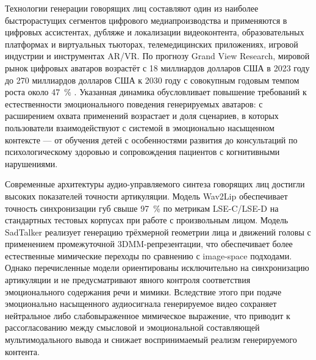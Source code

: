 \documentclass[a4paper, 12pt, oneside, openany]{article}
\begin{document}
Технологии генерации говорящих лиц составляют один из наиболее быстрорастущих сегментов цифрового медиапроизводства и применяются в цифровых ассистентах, дубляже и локализации видеоконтента, образовательных платформах и виртуальных тьюторах, телемедицинских приложениях, игровой индустрии и инструментах AR/VR. По прогнозу Grand View Research, мировой рынок цифровых аватаров возрастёт с 18 миллиардов долларов США в 2023 году до 270 миллиардов долларов США к 2030 году с совокупным годовым темпом роста около 47~\% \cite{gvr2024}. Указанная динамика обусловливает повышение требований к естественности эмоционального поведения генерируемых аватаров: с расширением охвата применений возрастает и доля сценариев, в которых пользователи взаимодействуют с системой в эмоционально насыщенном контексте --- от обучения детей с особенностями развития до консультаций по психологическому здоровью и сопровождения пациентов с когнитивными нарушениями.

Современные архитектуры аудио-управляемого синтеза говорящих лиц достигли высоких показателей точности артикуляции. Модель Wav2Lip \cite{prajwal2020wav2lip} обеспечивает точность синхронизации губ свыше 97~\% по метрикам LSE-C/LSE-D на стандартных тестовых корпусах при работе с произвольным лицом. Модель SadTalker \cite{zhang2023sadtalker} реализует генерацию трёхмерной геометрии лица и движений головы с применением промежуточной 3DMM-репрезентации, что обеспечивает более естественные мимические переходы по сравнению с image-space подходами. Однако перечисленные модели ориентированы исключительно на синхронизацию артикуляции и не предусматривают явного контроля соответствия эмоционального содержания речи и мимики. Вследствие этого при подаче эмоционально насыщенного аудиосигнала генерируемое видео сохраняет нейтральное либо слабовыраженное мимическое выражение, что приводит к рассогласованию между смысловой и эмоциональной составляющей мультимодального вывода и снижает воспринимаемый реализм генерируемого контента.
\end{document}
